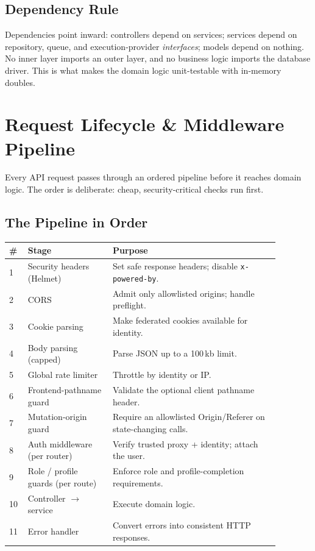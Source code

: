 \documentclass[12pt,a4paper,oneside]{report}
\newcommand{\code}[1]{\texttt{#1}}
\begin{document}
\section{Dependency Rule}
Dependencies point inward: controllers depend on services; services depend on
repository, queue, and execution-provider \emph{interfaces}; models depend on
nothing. No inner layer imports an outer layer, and no business logic imports the
database driver. This is what makes the domain logic unit-testable with
in-memory doubles.

\chapter{Request Lifecycle \& Middleware Pipeline}
Every API request passes through an ordered pipeline before it reaches domain
logic. The order is deliberate: cheap, security-critical checks run first.

\section{The Pipeline in Order}
\begin{longtable}{@{}p{0.05\linewidth} p{0.28\linewidth} p{0.55\linewidth}@{}}
\toprule
\textbf{\#} & \textbf{Stage} & \textbf{Purpose}\\
\midrule
\endhead
1 & Security headers (Helmet) & Set safe response headers; disable \code{x-powered-by}.\\
2 & CORS & Admit only allowlisted origins; handle preflight.\\
3 & Cookie parsing & Make federated cookies available for identity.\\
4 & Body parsing (capped) & Parse JSON up to a 100\,kb limit.\\
5 & Global rate limiter & Throttle by identity or IP.\\
6 & Frontend-pathname guard & Validate the optional client pathname header.\\
7 & Mutation-origin guard & Require an allowlisted Origin/Referer on state-changing calls.\\
8 & Auth middleware (per router) & Verify trusted proxy + identity; attach the user.\\
9 & Role / profile guards (per route) & Enforce role and profile-completion requirements.\\
10 & Controller $\to$ service & Execute domain logic.\\
11 & Error handler & Convert errors into consistent HTTP responses.\\
\bottomrule
\end{longtable}
\end{document}
